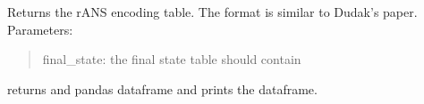 \documentclass[letterpaper,10pt,english]{sphinxmanual}
\begin{document}
\begin{fulllineitems}
\begin{fulllineitems}
\end{fulllineitems}


\begin{fulllineitems}
\label{\detokenize{ANS:ANS.rANS.rANS_encoding_table}}
\pysigstartsignatures
{}
\pysigstopsignatures
\sphinxAtStartPar
Returns the rANS encoding table. The format is similar to Dudak’s paper. 
Parameters:
\begin{quote}

\sphinxAtStartPar
final\_state: the final state table should contain
\end{quote}
\begin{description}
\begin{description}
\sphinxAtStartPar
returns and pandas dataframe and prints the dataframe.

\end{description}

\end{description}

\end{fulllineitems}


\end{fulllineitems}

\end{document}
